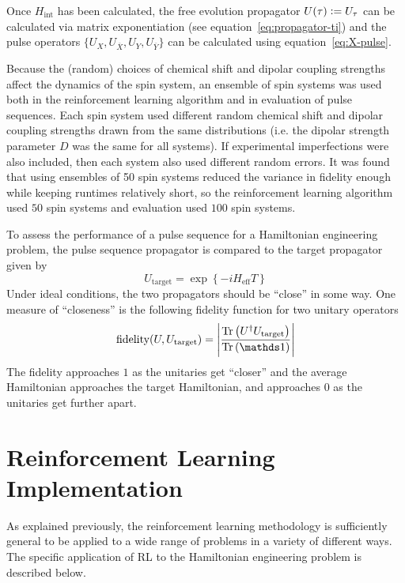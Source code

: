 
Once $H_{\text{int}}$ has been calculated, the free evolution propagator $U(\tau) \mathrel{\mathop:}= U_\tau$ can be calculated via matrix exponentiation (see equation~\ref{eq:propagator-ti})
and
the pulse operators $\{ U_X, U_{\overline{X}}, U_Y, U_{\overline{Y}} \}$ can be calculated using equation~\ref{eq:X-pulse}.

Because the (random) choices of chemical shift and dipolar coupling strengths affect the dynamics of the spin system, an ensemble of spin systems was used both in the reinforcement learning algorithm and in evaluation of pulse sequences.
Each spin system used different random chemical shift and dipolar coupling strengths drawn from the same distributions (i.e. the dipolar strength parameter $D$ was the same for all systems). If experimental imperfections were also included, then each system also used different random errors.
It was found that using ensembles of 50 spin systems reduced the variance in fidelity enough while keeping runtimes relatively short, so
the reinforcement learning algorithm used $50$ spin systems and evaluation used $100$ spin systems.

To assess the performance of a pulse sequence for a Hamiltonian engineering problem, the pulse sequence propagator is compared to the target propagator given by
\[
U_{\text{target}} = \exp\left\{ -i H_{\text{eff}} T \right\}
\]
Under ideal conditions, the two propagators should be ``close'' in some way. One measure of ``closeness'' is the following fidelity function for two unitary operators
\begin{equation}
    \text{fidelity}(U, U_\text{target}) = \left| \frac{\Tr{
        U^\dagger U_\text{target}
    }}{\Tr{\identity}} \right|
\end{equation}
The fidelity approaches $1$ as the unitaries get ``closer'' and the average Hamiltonian approaches the target Hamiltonian, and approaches $0$ as the unitaries get further apart.

\section{Reinforcement Learning Implementation}\label{sec:methods-RL}

As explained previously,
the reinforcement learning methodology is sufficiently general to be applied to a wide range of problems in a variety of different ways.  The specific application of RL to the Hamiltonian engineering problem is described below.

